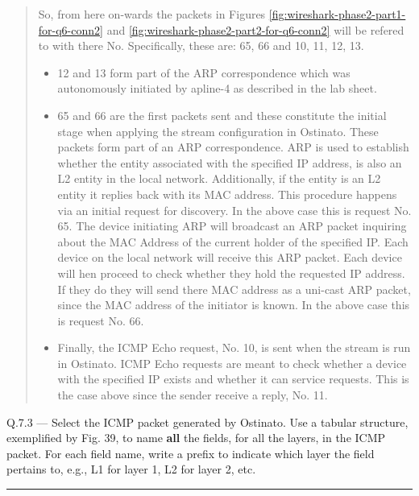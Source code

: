 \documentclass{article}
\newcommand\Que[2]{%
   \begin{samepage}
   \leavevmode\par
   \noindent
   Q.#1 --- #2\par\vspace{10pt}\hrule\vspace{10pt}
   \end{samepage}}
\newenvironment{ans}
   {\fbox{Answer}\begin{quote}\nopagebreak}
   {\end{quote}}
\begin{document}
\begin{ans}
So, from here on-wards the packets in Figures
\ref{fig:wireshark-phase2-part1-for-q6-conn2} and
\ref{fig:wireshark-phase2-part2-for-q6-conn2} will be
refered to with there No. Specifically, these are: 65,
66 and 10, 11, 12, 13.

\begin{itemize}
\item 12 and 13 form part of the ARP
      correspondence which was autonomously
      initiated by apline-4 as described in
      the lab sheet.
\item 65 and 66 are the first packets sent and
      these constitute the initial stage when
      applying the stream configuration in
      Ostinato. These packets form part of an
      ARP correspondence. ARP is used to
      establish whether the entity associated
      with the specified IP address, is also
      an L2 entity in the local network.
      Additionally, if the entity is an L2
      entity it replies back with its MAC
      address. This procedure happens via an
      initial request for discovery. In the
      above case this is request No. 65. The
      device initiating ARP will broadcast an
      ARP packet inquiring about the MAC
      Address of the current holder of the
      specified IP. Each device on the local
      network will receive this ARP packet.
      Each device will hen proceed to check
      whether they hold the requested IP
      address. If they do they will send there
      MAC address as a uni-cast ARP packet,
      since the MAC address of the initiator
      is known. In the above case this is
      request No. 66.
\item Finally, the ICMP Echo request, No. 10, is sent when the
      stream is run in Ostinato. ICMP Echo requests are meant to
      check whether a device with the specified IP exists and
      whether it can service requests. This is the case above
      since the sender receive a reply, No. 11.
\end{itemize}
\end{ans}

\Que{7.3}{Select the ICMP packet generated by Ostinato. Use a
tabular structure, exemplified by Fig. 39, to name
\textbf{all} the fields, for all the layers, in the ICMP
packet. For each field name, write a prefix to indicate
which layer the field pertains to, e.g., L1 for layer 1,
L2 for layer 2, etc.}
\end{document}
